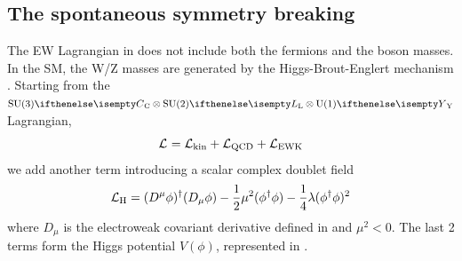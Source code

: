 \subsection{The spontaneous symmetry breaking}\label{sub:SM}
The EW Lagrangian in  does not include both the fermions and the boson masses.
In the SM, the W/Z masses are generated by the Higgs-Brout-Englert mechanism \cite{Higgs1964BrokenBosons,Englert1964BrokenMesons}.
Starting from the  $\SU[C]{3} \otimes \SU[L]{2} \otimes \U[Y]{1}$ Lagrangian,
\begin{equation}
    \mathcal{L}_\text{}=\mathcal{L}_\text{kin}+\mathcal{L}_\text{QCD}+\mathcal{L}_\text{EWK}
\end{equation}
we add another term introducing a scalar complex doublet field
\begin{equation}\label{eq:Higgs_preSSB}
    \mathcal{L}_\text{H}=(D^{\mu}\phi)^{\dagger}(D_{\mu}\phi)-\frac{1}{2}\mu^{2}(\phi^{\dagger}\phi)-\frac{1}{4}\lambda(\phi^{\dagger}\phi)^{2}
\end{equation}
where $D_\mu$ is the electroweak covariant derivative defined in  and $\mu^2<0$.
The last 2 terms form the Higgs potential $V(\phi)$, represented in .

